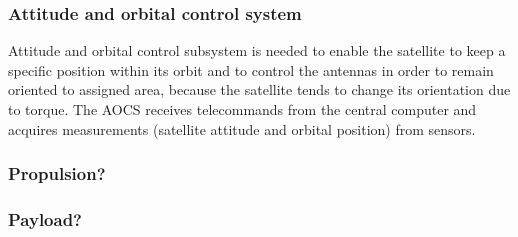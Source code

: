 \subsubsection{Attitude and orbital control system}
Attitude and orbital control subsystem is needed to enable the satellite to keep a specific position within its orbit and to control the antennas in order to remain oriented to assigned area, because the satellite tends to change its orientation due to torque. The AOCS receives telecommands from the central computer and acquires measurements (satellite attitude and orbital position) from sensors.

\subsubsection{Propulsion?}

\subsubsection{Payload?}





